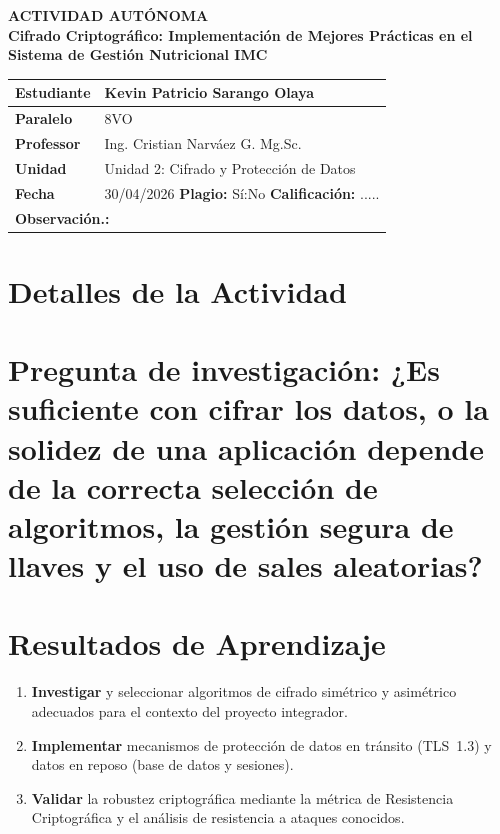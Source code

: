 \begin{center}
\textbf{ACTIVIDAD AUTÓNOMA} \\
\vspace{0.5cm}
\textbf{Cifrado Criptográfico: Implementación de Mejores Prácticas en el Sistema de Gestión Nutricional IMC}
\end{center}

\begin{center}
\begin{tabular}{|l|l|}
\hline
   \textbf{Estudiante}  &  Kevin Patricio Sarango Olaya \hspace{3.5cm} \\
\hline
   \textbf{Paralelo} &  8VO \hspace{3.5cm} \\
\hline
   \textbf{Professor} &  Ing. Cristian Narváez G. Mg.Sc.\\
\hline
   \textbf{Unidad} & Unidad 2: Cifrado y Protección de Datos \\
\hline
   \textbf{Fecha} & 30/04/2026 \hspace{1cm} \textbf{Plagio:} Sí:\quad No\quad \hspace{2.4cm} \textbf{Calificación:} ..... \\
\hline
   \multicolumn{2}{|l|}{\textbf{Observación.:} } \\
\hline
\end{tabular}
\end{center}

\section*{Detalles de la Actividad}
\section*{Pregunta de investigación: ¿Es suficiente con cifrar los datos, o la solidez de una
aplicación depende de la correcta selección de algoritmos, la gestión segura de llaves y el uso
de sales aleatorias?}

\section*{Resultados de Aprendizaje}
\begin{enumerate}
    \item \textbf{Investigar} y seleccionar algoritmos de cifrado simétrico y asimétrico adecuados
          para el contexto del proyecto integrador.
    \item \textbf{Implementar} mecanismos de protección de datos en tránsito (TLS~1.3) y datos en
          reposo (base de datos y sesiones).
    \item \textbf{Validar} la robustez criptográfica mediante la métrica de Resistencia Criptográfica
          y el análisis de resistencia a ataques conocidos.
\end{enumerate}
